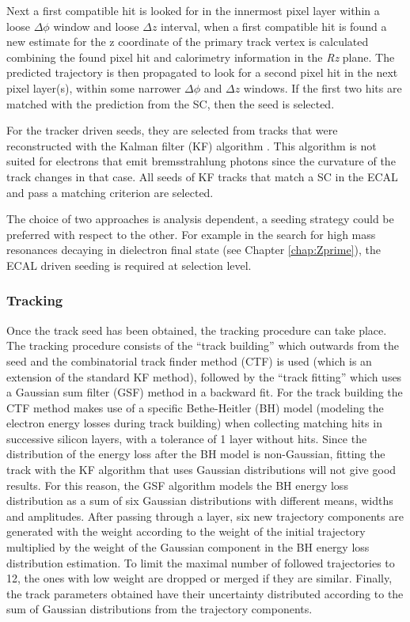 Next a first compatible hit is looked for in the innermost pixel layer within a loose $\Delta\phi$ window and loose $\Delta z$ interval, when a first compatible hit is found a new estimate for the z coordinate of the primary track vertex is calculated combining the found pixel hit and calorimetry information in the \textit{Rz} plane. The predicted trajectory is then propagated to look for a second pixel hit in the next pixel layer(s), within some narrower $\Delta\phi$ and $\Delta z$ windows. If the first two hits are matched with the prediction from the SC, then the seed is selected.

For the tracker driven seeds, they are selected from tracks that were reconstructed with the Kalman filter (KF) algorithm \cite{Hamilton:2016qnl}. This algorithm is not suited for electrons that emit bremsstrahlung photons since the curvature of the track changes in that case. All seeds of KF tracks that match a SC in the ECAL and pass a matching criterion are selected.

The choice of two approaches is analysis dependent, a seeding strategy could be preferred with respect to the other. For example in the search for high mass resonances decaying in dielectron final state (see Chapter \ref{chap:Zprime}), the ECAL driven seeding is required at selection level.


\subsubsection{Tracking}\label{subsec:tracking}

Once the track seed has been obtained, the tracking procedure can take place. The tracking procedure consists of the  ``track building'' which outwards from the seed and the combinatorial track finder method (CTF) \cite{track_jinst} is used (which is an extension of the standard KF method), followed by the ``track fitting'' which uses a Gaussian sum filter (GSF) method \cite{Anuar:2015lxt} in a backward fit. For the track building the CTF method makes use of a specific Bethe-Heitler (BH) \cite{PhysRevA.87.062107} model (modeling the electron energy losses during track building) when collecting matching hits in successive silicon layers, with a tolerance of 1 layer without hits. Since the distribution of the energy loss after the BH model is non-Gaussian, fitting the track with the KF algorithm that uses Gaussian distributions will not give good results. For this reason, the GSF algorithm models the BH energy loss distribution as a sum of six Gaussian distributions with different means, widths and amplitudes. After passing through a layer, six new trajectory components are generated with the weight according to the weight of the initial trajectory multiplied by the weight of the Gaussian component in the BH energy loss distribution estimation. To limit the maximal number of followed trajectories to 12, the ones with low weight are dropped or merged if they are similar. Finally, the track parameters obtained have their uncertainty distributed according to the sum of Gaussian distributions from the trajectory components.

